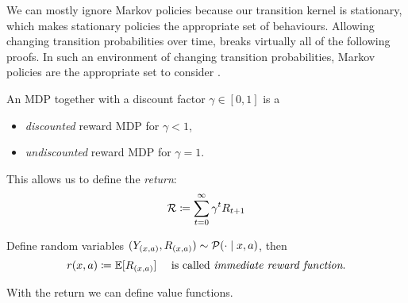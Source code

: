 We can mostly ignore Markov policies because our transition kernel is stationary, which makes stationary policies the appropriate set of behaviours. Allowing changing transition probabilities over time, breaks virtually all of the following proofs. In such an environment of changing transition probabilities, Markov policies are the appropriate set to consider \parencite[c.f.][]{putermanMarkovDecisionProcesses2005}.

\begin{definition}
An MDP together with a discount factor \(\gamma\in[0,1]\) is a
\begin{itemize}[nosep]
	\item \emph{discounted} reward MDP for \(\gamma <1 \),
	\item \emph{undiscounted} reward MDP for \(\gamma=1 \).
\end{itemize}
This allows us to define the \emph{return}: 
\[
	\mathcal{R}\coloneqq\sum_{t=0}^{\infty}\gamma^t R_{t+1}
\]
\end{definition}

\begin{definition}
Define random variables \((Y_{(x,a)}, R_{(x,a)})\sim \mathcal{P}(\cdot\mid x,a) \), then 
\[
	r(x,a)\coloneqq \mathbb{E}[R_{(x,a)}] \quad\text{ is called \emph{immediate reward function}.}
\]
\end{definition}

With the return we can define value functions.

